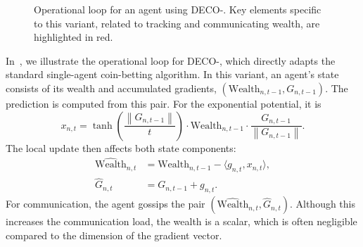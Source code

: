 \documentclass[journal]{IEEEtran} %
\newcommand{\w}{\text{Wealth}}
\newcommand{\br}[1]{\left(#1\right)}
\newcommand{\norm}[1]{\left\lVert{#1}\right\rVert}
\newcommand{\algname}{{DECO}\xspace}
\begin{document}
\begin{figure}[tbp!]
    \centering
    \caption{Operational loop for an agent using \algname{}-.
        Key elements specific to this variant, related to tracking and communicating wealth, are highlighted in red.}\label{fig:flow-i}
\end{figure}

In~, we illustrate the operational loop for \algname{}-, which directly adapts the standard single-agent coin-betting algorithm.
In this variant, an agent's state consists of its wealth and accumulated gradients, $(\w_{n,t-1}, G_{n,t-1})$.
The prediction is computed from this pair.
For the exponential potential, it is
\begin{equation}
    x_{n,t} = \tanh\br{\frac{\norm{G_{n,t-1}}}{t}} \cdot \w_{n,t-1} \cdot \frac{G_{n,t-1}}{\norm{G_{n,t-1}}}.\label{eq:deco1_bet_vec}
\end{equation}
The local update then affects both state components:
\begin{align}
    \hat{\w}_{n,t} & = \w_{n,t-1} - \langle g_{n,t}, x_{n,t} \rangle,\label{eq:local-update-wealth} \\
    \hat{G}_{n,t}  & = G_{n,t-1} + g_{n,t}.\label{eq:local-update-G}
\end{align}
For communication, the agent gossips the pair $(\hat{\w}_{n,t}, \hat{G}_{n,t})$.
Although this increases the communication load, the wealth is a scalar, which is often negligible compared to the dimension of the gradient vector.
\end{document}
